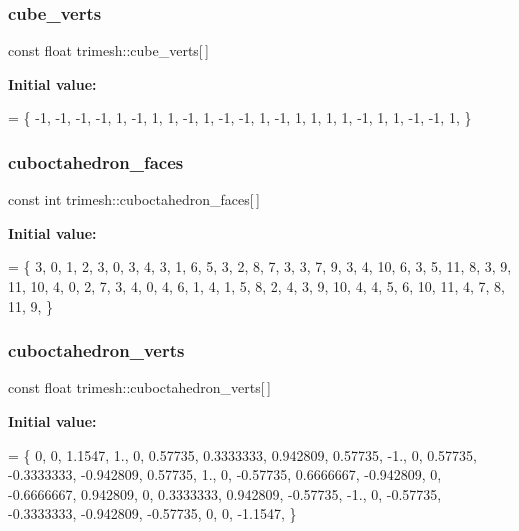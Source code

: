 \subsubsection{\texorpdfstring{cube\+\_\+verts}{cube\_verts}}
{\footnotesize\ttfamily const float trimesh\+::cube\+\_\+verts\mbox{[}$\,$\mbox{]}\hspace{0.3cm}{\ttfamily [static]}}

{\bfseries Initial value\+:}
\begin{DoxyCode}
= \{
    -1, -1, -1,
    -1,  1, -1,
    1,  1, -1,
    1, -1, -1,
    1, -1,  1,
    1,  1,  1,
    -1,  1,  1,
    -1, -1,  1,
\}
\end{DoxyCode}
\mbox{\label{namespacetrimesh_ade1638f83d9a62ed65daa5c093ca1497}} 
\subsubsection{\texorpdfstring{cuboctahedron\+\_\+faces}{cuboctahedron\_faces}}
{\footnotesize\ttfamily const int trimesh\+::cuboctahedron\+\_\+faces\mbox{[}$\,$\mbox{]}\hspace{0.3cm}{\ttfamily [static]}}

{\bfseries Initial value\+:}
\begin{DoxyCode}
= \{
    3, 0, 1, 2,
    3, 0, 3, 4,
    3, 1, 6, 5,
    3, 2, 8, 7,
    3, 3, 7, 9,
    3, 4, 10, 6,
    3, 5, 11, 8,
    3, 9, 11, 10,
    4, 0, 2, 7, 3,
    4, 0, 4, 6, 1,
    4, 1, 5, 8, 2,
    4, 3, 9, 10, 4,
    4, 5, 6, 10, 11,
    4, 7, 8, 11, 9,
\}
\end{DoxyCode}
\mbox{\label{namespacetrimesh_a5f53c82abd2220810237437bc6c2f5af}} 
\subsubsection{\texorpdfstring{cuboctahedron\+\_\+verts}{cuboctahedron\_verts}}
{\footnotesize\ttfamily const float trimesh\+::cuboctahedron\+\_\+verts\mbox{[}$\,$\mbox{]}\hspace{0.3cm}{\ttfamily [static]}}

{\bfseries Initial value\+:}
\begin{DoxyCode}
= \{
    0, 0, 1.1547,
    1., 0, 0.57735,
    0.3333333, 0.942809, 0.57735,
    -1., 0, 0.57735,
    -0.3333333, -0.942809, 0.57735,
    1., 0, -0.57735,
    0.6666667, -0.942809, 0,
    -0.6666667, 0.942809, 0,
    0.3333333, 0.942809, -0.57735,
    -1., 0, -0.57735,
    -0.3333333, -0.942809, -0.57735,
    0, 0, -1.1547,
\}
\end{DoxyCode}
\mbox{\label{namespacetrimesh_ab63f30606fb8d52eacf0421cb3e3ba63}} 
